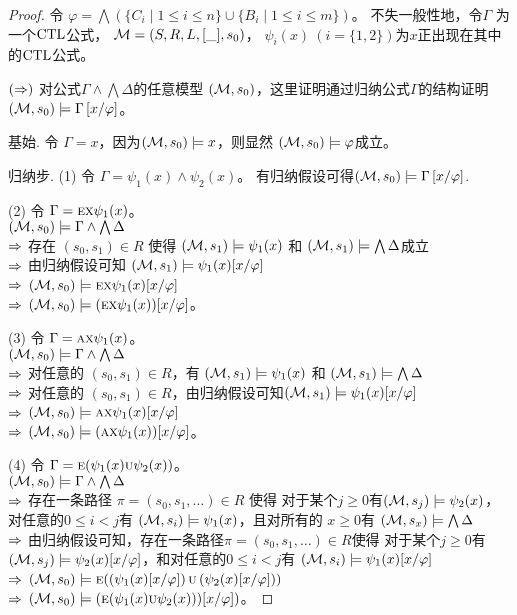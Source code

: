 \begin{proof}
	令 $\varphi = \bigwedge\left(\{C_i\mid 1\le i\le n\}\cup\{B_i\mid 1\le i\le m\}\right)$。
	不失一般性地，令$\Gamma$ 为一个$\textrm{CTL}$公式， ${\cal M}=(S,R,L,[\_],s_0)$， $\psi_i(x)~(i=\{1,2\})$为$x$正出现在其中的$\textrm{CTL}$公式。
	
	$(\Rightarrow)$ 对公式$\Gamma \wedge \bigwedge \Delta$的任意模型 $({\cal M}, s_0)$，这里证明通过归纳公式$\Gamma$的结构证明 $({\cal M}, s_0)\models\Gamma\left[x/\varphi \right]$。
	
	基始. 令 $\Gamma = x$，因为$({\cal M}, s_0)\models x$，则显然 $({\cal M}, s_0)\models \varphi$成立。
	
	归纳步. (1) 令 $\Gamma= \psi_1(x) \wedge \psi_2(x)$。
	有归纳假设可得$({\cal M}, s_0)\models \Gamma\left[x/\varphi \right]$. 
	
	(2) 令 $\Gamma = \textsc{e}\textsc{x} \psi_1(x)$。 \\
	$({\cal M},s_0)\models \Gamma \wedge \bigwedge \Delta$\\
	$\Rightarrow$ 存在 $(s_0, s_1)\in R$ 使得 $({\cal M},s_1) \models \psi_1(x)$ 和 $({\cal M},s_1) \models \bigwedge \Delta$成立\\
	$\Rightarrow$ 由归纳假设可知 $({\cal M},s_1) \models \psi_1(x)[x/\varphi]$\\
	$\Rightarrow$ $({\cal M},s_0)\models \textsc{e}\textsc{x} \psi_1(x)[x/\varphi]$\\
	$\Rightarrow$ $({\cal M},s_0)\models (\textsc{e}\textsc{x} \psi_1(x))[x/\varphi]$。
	
	(3) 令 $\Gamma = \textsc{a}\textsc{x} \psi_1(x)$。 \\
	$({\cal M},s_0)\models \Gamma \wedge \bigwedge \Delta$\\
	$\Rightarrow$ 对任意的 $(s_0, s_1)\in R$，有 $({\cal M},s_1) \models \psi_1(x)$ 和 $({\cal M},s_1) \models \bigwedge \Delta$\\
	$\Rightarrow$  对任意的 $(s_0, s_1)\in R$，由归纳假设可知$({\cal M},s_1) \models \psi_1(x)[x/\varphi]$\\
	$\Rightarrow$ $({\cal M},s_0)\models \textsc{a}\textsc{x} \psi_1(x)[x/\varphi]$\\
	$\Rightarrow$ $({\cal M},s_0)\models (\textsc{a}\textsc{x} \psi_1(x))[x/\varphi]$。
	
	(4) 令 $\Gamma = \textsc{e}(\psi_1(x) \textsc{u} \psi_2(x))$。 \\
	$({\cal M},s_0)\models \Gamma \wedge \bigwedge \Delta$\\
	$\Rightarrow$ 存在一条路径 $\pi=(s_0, s_1, \dots)\in R$ 使得 对于某个$j \geq 0$有$({\cal M},s_j) \models \psi_2(x)$，对任意的$0\leq i < j$有 $({\cal M},s_i) \models \psi_1(x)$，且对所有的 $x \geq 0$有 $({\cal M},s_x) \models \bigwedge \Delta$\\
	$\Rightarrow$ 由归纳假设可知，存在一条路径$\pi=(s_0, s_1, \dots)\in R$使得 对于某个$j \geq 0$有$({\cal M},s_j) \models \psi_2(x)[x/\varphi]$，和对任意的$0\leq i < j$有 $({\cal M},s_i) \models \psi_1(x)[x/\varphi]$\\
	$\Rightarrow$ $({\cal M},s_0)\models \textsc{e}(\left(\psi_1(x)[x/\varphi]\right) \textsc{u} \left(\psi_2(x)[x/\varphi]\right))$\\
	$\Rightarrow$ $({\cal M},s_0)\models \left(\textsc{e}(\psi_1(x) \textsc{u} \psi_2(x)))[x/\varphi]\right)$。
	

\end{proof}
